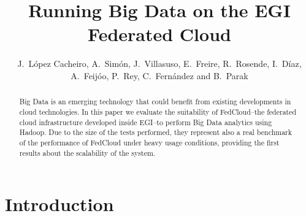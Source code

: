 \documentclass[oribibl]{llncs_Ibergrid2013}
\begin{document}
%
\frontmatter          %
%
\pagestyle{headings}  %
%
\mainmatter              %
%
\title{Running Big Data on the EGI Federated Cloud}
%
%
\author{J.~L\'opez Cacheiro, A.~Sim\'on, J.~Villasuso, E.~Freire, R.~Rosende, I.~D\'iaz, A.~Feij\'oo, P.~Rey, C.~Fern\'andez and B.~Parak}
%
%
%




\maketitle              %

\begin{abstract}
Big Data is an emerging technology that could benefit from existing developments in cloud technologies. In this paper we evaluate the suitability of FedCloud--the federated cloud infrastructure developed inside EGI--to perform Big Data analytics using Hadoop. Due to the size of the tests performed, they represent also a real benchmark of the performance of FedCloud under heavy usage conditions, providing the first results about the scalability of the system.


\end{abstract}

%
\section{Introduction}
\label{sect-introduction}
\end{document}
